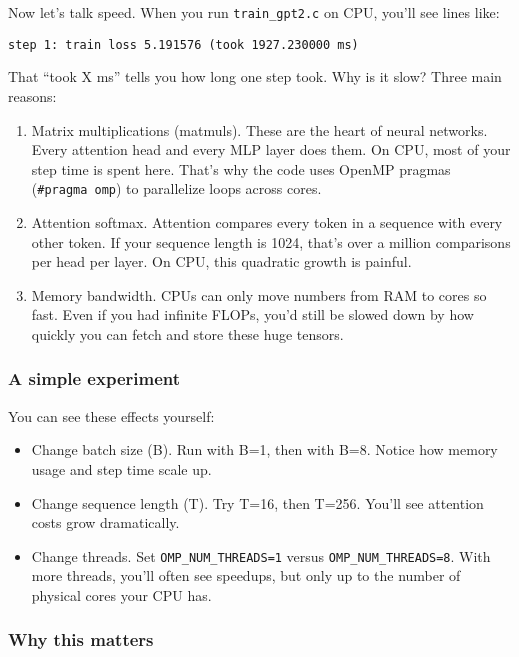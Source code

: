 \documentclass[
  letterpaper,
  DIV=11,
  numbers=noendperiod]{scrreprt}
\providecommand{\tightlist}{%
  \setlength{\itemsep}{0pt}\setlength{\parskip}{0pt}}
\begin{document}
Now let's talk speed. When you run \texttt{train\_gpt2.c} on CPU, you'll
see lines like:

\begin{verbatim}
step 1: train loss 5.191576 (took 1927.230000 ms)
\end{verbatim}

That ``took X ms'' tells you how long one step took. Why is it slow?
Three main reasons:

\begin{enumerate}
\def\labelenumi{\arabic{enumi}.}
\item
  Matrix multiplications (matmuls). These are the heart of neural
  networks. Every attention head and every MLP layer does them. On CPU,
  most of your step time is spent here. That's why the code uses OpenMP
  pragmas (\texttt{\#pragma\ omp}) to parallelize loops across cores.
\item
  Attention softmax. Attention compares every token in a sequence with
  every other token. If your sequence length is 1024, that's over a
  million comparisons per head per layer. On CPU, this quadratic growth
  is painful.
\item
  Memory bandwidth. CPUs can only move numbers from RAM to cores so
  fast. Even if you had infinite FLOPs, you'd still be slowed down by
  how quickly you can fetch and store these huge tensors.
\end{enumerate}

\subsubsection{A simple experiment}\label{a-simple-experiment}

You can see these effects yourself:

\begin{itemize}
\tightlist
\item
  Change batch size (B). Run with B=1, then with B=8. Notice how memory
  usage and step time scale up.
\item
  Change sequence length (T). Try T=16, then T=256. You'll see attention
  costs grow dramatically.
\item
  Change threads. Set \texttt{OMP\_NUM\_THREADS=1} versus
  \texttt{OMP\_NUM\_THREADS=8}. With more threads, you'll often see
  speedups, but only up to the number of physical cores your CPU has.
\end{itemize}

\subsubsection{Why this matters}\label{why-this-matters-2}
\end{document}

